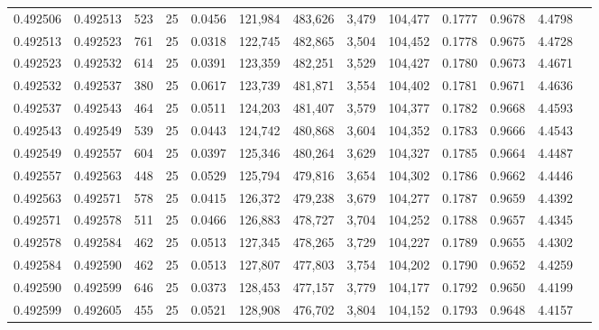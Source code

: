 \begin{tabular}{rrrrrrrrrrrrr}
0.492506 & 0.492513 &   523 &  25 &                                     0.0456 & 121,984 & 483,626 &   3,479 & 104,477 & 0.1777 & 0.9678 & 4.4798 \\
0.492513 & 0.492523 &   761 &  25 &                                     0.0318 & 122,745 & 482,865 &   3,504 & 104,452 & 0.1778 & 0.9675 & 4.4728 \\
0.492523 & 0.492532 &   614 &  25 &                                     0.0391 & 123,359 & 482,251 &   3,529 & 104,427 & 0.1780 & 0.9673 & 4.4671 \\
0.492532 & 0.492537 &   380 &  25 &                                     0.0617 & 123,739 & 481,871 &   3,554 & 104,402 & 0.1781 & 0.9671 & 4.4636 \\
0.492537 & 0.492543 &   464 &  25 &                                     0.0511 & 124,203 & 481,407 &   3,579 & 104,377 & 0.1782 & 0.9668 & 4.4593 \\
0.492543 & 0.492549 &   539 &  25 &                                     0.0443 & 124,742 & 480,868 &   3,604 & 104,352 & 0.1783 & 0.9666 & 4.4543 \\
0.492549 & 0.492557 &   604 &  25 &                                     0.0397 & 125,346 & 480,264 &   3,629 & 104,327 & 0.1785 & 0.9664 & 4.4487 \\
0.492557 & 0.492563 &   448 &  25 &                                     0.0529 & 125,794 & 479,816 &   3,654 & 104,302 & 0.1786 & 0.9662 & 4.4446 \\
0.492563 & 0.492571 &   578 &  25 &                                     0.0415 & 126,372 & 479,238 &   3,679 & 104,277 & 0.1787 & 0.9659 & 4.4392 \\
0.492571 & 0.492578 &   511 &  25 &                                     0.0466 & 126,883 & 478,727 &   3,704 & 104,252 & 0.1788 & 0.9657 & 4.4345 \\
0.492578 & 0.492584 &   462 &  25 &                                     0.0513 & 127,345 & 478,265 &   3,729 & 104,227 & 0.1789 & 0.9655 & 4.4302 \\
0.492584 & 0.492590 &   462 &  25 &                                     0.0513 & 127,807 & 477,803 &   3,754 & 104,202 & 0.1790 & 0.9652 & 4.4259 \\
0.492590 & 0.492599 &   646 &  25 &                                     0.0373 & 128,453 & 477,157 &   3,779 & 104,177 & 0.1792 & 0.9650 & 4.4199 \\
0.492599 & 0.492605 &   455 &  25 &                                     0.0521 & 128,908 & 476,702 &   3,804 & 104,152 & 0.1793 & 0.9648 & 4.4157 \\

\end{tabular}

